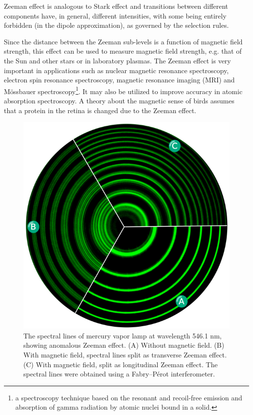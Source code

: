 \documentclass[%
 reprint,
nofootinbib,
 amsmath,amssymb,
 aps,
floatfix,
]{revtex4-2}
\begin{document}
    \par
    Zeeman effect is analogous to Stark effect and transitions between different components have, in general, different intensities, with some being entirely forbidden (in the dipole approximation), as governed by the selection rules.
    \par
    Since the distance between the Zeeman sub-levels is a function of magnetic field strength, this effect can be used to measure magnetic field strength, e.g. that of the Sun and other stars or in laboratory plasmas. The Zeeman effect is very important in applications such as nuclear magnetic resonance spectroscopy, electron spin resonance spectroscopy, magnetic resonance imaging (MRI) and Mössbauer spectroscopy\footnote{a spectroscopy technique based on the resonant and recoil-free emission and absorption of gamma radiation by atomic nuclei bound in a solid.}. It may also be utilized to improve accuracy in atomic absorption spectroscopy. A theory about the magnetic sense of birds assumes that a protein in the retina is changed due to the Zeeman effect.
    \begin{figure}
        \centering
        \includegraphics[scale = 0.75]{Figures/zeemanillus.png}
        \caption{The spectral lines of mercury vapor lamp at wavelength 546.1 nm, showing anomalous Zeeman effect. (A) Without magnetic field. (B) With magnetic field, spectral lines split as transverse Zeeman effect. (C) With magnetic field, split as longitudinal Zeeman effect. The spectral lines were obtained using a Fabry–Pérot interferometer.}
        \label{fig:illus}
    \end{figure}
    
\end{document}
